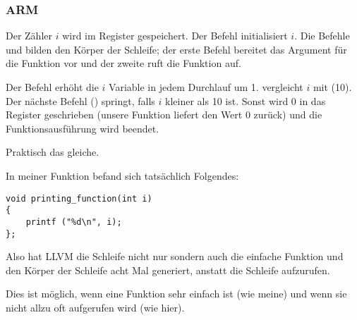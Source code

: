 \subsubsection{ARM}

\myparagraph{\NonOptimizingKeilVI (\ARMMode)}



Der Zähler $i$ wird im Register  gespeichert. 
Der Befehl  initialisiert $i$.
Die Befehle  und  bilden den Körper
der Schleife; der erste Befehl bereitet das Argument für die \ttf Funktion vor
und der zweite ruft die Funktion auf.

Der Befehl  erhöht die $i$ Variable in jedem Durchlauf um
1.
 vergleicht $i$ mit  (10). 
Der nächste Befehl  () springt, falls $i$ kleiner
als 10 ist. Sonst wird 0 in das Register  geschrieben (unsere Funktion
liefert den Wert 0 zurück) und die Funktionsausführung wird beendet.

\myparagraph{\OptimizingKeilVI (\ThumbMode)}



Praktisch das gleiche.

\myparagraph{\OptimizingXcodeIV (\ThumbTwoMode)}
\label{ARM_unrolled_loops}



In meiner \ttf Funktion befand sich tatsächlich Folgendes:

\begin{lstlisting}
void printing_function(int i)
{
    printf ("%d\n", i);
};
\end{lstlisting}

Also hat LLVM die Schleife nicht nur  sondern auch die einfache
Funktion \ttf {} und den Körper der Schleife acht Mal generiert,
anstatt die Schleife aufzurufen. 

Dies ist möglich, wenn eine Funktion sehr einfach ist (wie meine) und wenn sie
nicht allzu oft aufgerufen wird (wie hier).







